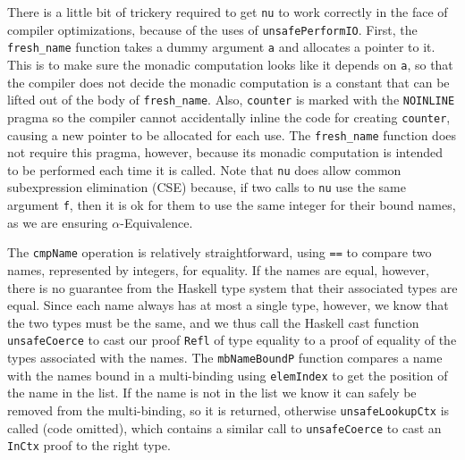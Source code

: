 \documentclass[natbib]{sigplanconf}
\begin{document}
There is a little bit of trickery required to get \lstinline{nu} to
work correctly in the face of compiler optimizations, because of the
uses of \lstinline{unsafePerformIO}.  First, the
\lstinline{fresh_name} function takes a dummy argument \lstinline{a}
and allocates a pointer to it. This is to make sure the monadic
computation looks like it depends on \lstinline{a}, so that the
compiler does not decide the monadic computation is a constant that can be
lifted out of the body of \lstinline{fresh_name}.  Also,
\lstinline{counter} is marked with the \lstinline{NOINLINE} pragma so
the compiler cannot accidentally inline the code for creating
\lstinline{counter}, causing a new pointer to be allocated for each
use. The \lstinline{fresh_name} function does not require this pragma,
however, because its monadic computation is intended to be performed
each time it is called. Note that \lstinline{nu} does allow common
subexpression elimination (CSE) because, if two calls to
\lstinline{nu} use the same argument \lstinline{f}, then it is ok for
them to use the same integer for their bound names, as we are ensuring
$\alpha$-Equivalence.


The \lstinline{cmpName} operation is relatively straightforward, using
\lstinline{==} to compare two names, represented by integers, for
equality.  If the names are equal, however, there is no guarantee from
the Haskell type system that their associated types are equal.  Since
each name always has at most a single type, however, we know that the
two types must be the same, and we thus call the Haskell cast function
\lstinline{unsafeCoerce} to cast our proof \lstinline{Refl} of type
equality to a proof of equality of the types associated with the
names. The \lstinline{mbNameBoundP} function compares a name with the
names bound in a multi-binding using \lstinline{elemIndex} to get the
position of the name in the list. If the name is not in the list we
know it can safely be removed from the multi-binding, so it is
returned, otherwise \lstinline{unsafeLookupCtx} is called (code
omitted), which contains a similar call to \lstinline{unsafeCoerce} to
cast an \lstinline{InCtx} proof to the right type.
\end{document}
